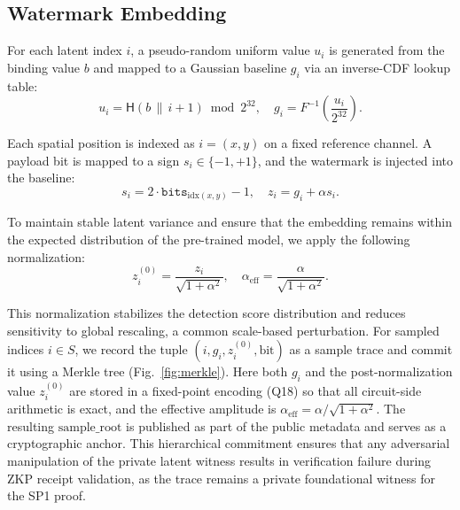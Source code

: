 \documentclass{article}
\theoremstyle{plain}
\theoremstyle{definition}
\theoremstyle{remark}
\begin{document}
\subsection{Watermark Embedding}\label{sec:embedding}
For each latent index \(i\), a pseudo-random uniform value \(u_i\) is generated from the
binding value \(b\) and mapped to a Gaussian baseline \(g_i\) via an inverse-CDF lookup
table:
\begin{equation}
u_i = \mathsf{H}(b \,\|\, i{+}1) \bmod 2^{32},
\quad
g_i = F^{-1}\!\left( \frac{u_i}{2^{32}} \right).
\end{equation}

Each spatial position is indexed as \(i=(x,y)\) on a fixed reference channel. A payload bit
is mapped to a sign \(s_i \in \{-1,+1\}\), and the watermark is injected into the baseline:
\begin{equation}
s_i = 2 \cdot \mathtt{bits}_{\mathrm{idx}(x,y)} - 1,
\quad
z_i = g_i + \alpha s_i.
\end{equation}

To maintain stable latent variance and ensure that the embedding remains within the
expected distribution of the pre-trained model, we apply the following normalization:
\begin{equation}
z_i^{(0)} = \frac{z_i}{\sqrt{1+\alpha^2}},
\quad
\alpha_{\mathrm{eff}} = \frac{\alpha}{\sqrt{1+\alpha^2}}.
\end{equation}

This normalization stabilizes the detection score distribution and reduces sensitivity to
global rescaling, a common scale-based perturbation. For sampled indices \(i \in S\), we
record the tuple \((i, g_i, z_i^{(0)}, \mathrm{bit})\) as a sample trace and commit it using a Merkle
tree (Fig.~\ref{fig:merkle}). Here both $g_i$ and the post-normalization value $z_i^{(0)}$ are stored in a fixed-point encoding (Q18) so that all circuit-side arithmetic is exact, and the effective amplitude is $\alpha_{\mathrm{eff}} = \alpha/\sqrt{1+\alpha^2}$. The resulting \(\mathrm{sample\_root}\) is published as part of
the public metadata and serves as a cryptographic anchor. This hierarchical commitment
ensures that any adversarial manipulation of the private latent witness results in
verification failure during ZKP receipt validation, as the trace remains a private
foundational witness for the SP1 proof.
\end{document}
